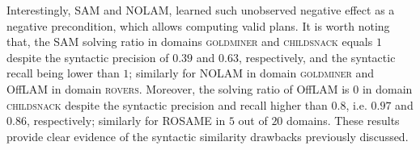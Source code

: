 \documentclass[letterpaper]{article} %
\newcommand{\nolam}{NOLAM\xspace}
\newcommand{\offlam}{OffLAM\xspace}
\newcommand{\rosame}{ROSAME\xspace}
\newcommand{\samshort}{SAM\xspace}
\newif\ifaddcomments
\newcommand{\roni}[1]{\ifaddcomments{\textcolor{red}{[Roni: #1]}}\fi}
\newcommand{\leo}[1]{\ifaddcomments{\textcolor{pink}{[Leonardo: #1]}}\fi}
\begin{document}
Interestingly, \samshort and \nolam, learned such unobserved negative effect as a negative precondition, which allows computing valid plans.
%
It is worth noting that, the \samshort solving ratio in domains \textsc{goldminer} and \textsc{childsnack} equals $1$ despite the syntactic precision of $0.39$ and $0.63$, respectively, and the syntactic recall being lower than $1$; similarly for \nolam in domain \textsc{goldminer} and \offlam in domain \textsc{rovers}. 
%
Moreover, the solving ratio of \offlam is $0$ in domain \textsc{childsnack} despite the syntactic precision and recall higher than $0.8$, i.e. $0.97$ and $0.86$, respectively; similarly for \rosame in $5$ out of $20$ domains. 
%
These results provide clear evidence of the syntactic similarity drawbacks previously discussed.





\end{document}
